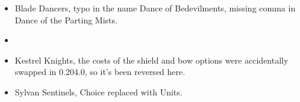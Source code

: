 \subtitle{Special}

\begin{itemize}[label={-}]
\item Blade Dancers, typo in the name Dance of Bedevilments, missing comma in Dance of the Parting Mists.
\item {}
\item Kestrel Knights, the costs of the shield and bow options were accidentally swapped in 0.204.0, so it's been reversed here.
\end{itemize}

\subtitle{Unseen Arrows}

\begin{itemize}[label={-}]
\item Sylvan Sentinels, Choice replaced with Units.
\end{itemize}
